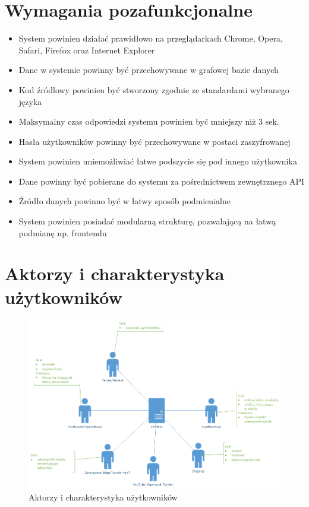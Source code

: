 \section{Wymagania pozafunkcjonalne}
\begin{itemize}
\item System powinien działać prawidłowo na przeglądarkach Chrome, Opera, Safari, Firefox oraz Internet Explorer
\item Dane w systemie powinny być przechowywane w grafowej bazie danych
\item Kod źródlowy powinien być stworzony zgodnie ze standardami wybranego języka
\item Maksymalny czas odpowiedzi systemu powinien być mniejszy niż 3 sek.
\item Hasła użytkowników powinny być przechowywane w postaci zaszyfrowanej
\item System powinien uniemożliwiać łatwe podszycie się pod innego użytkownika 
\item Dane powinny być pobierane do systemu za pośrednictwem zewnętrznego API
\item Źródło danych powinno być w łatwy sposób podmienialne
\item System powinien posiadać modularną strukturę, pozwalającą na łatwą podmianę np. frontendu
\end{itemize}

\section{Aktorzy i charakterystyka użytkowników}
\begin{figure}[H]
	\centering
	\includegraphics[width=\textwidth, keepaspectratio=true]{images/Strony_cele.png}
	\caption{Aktorzy i charakterystyka użytkowników}
\end{figure}
